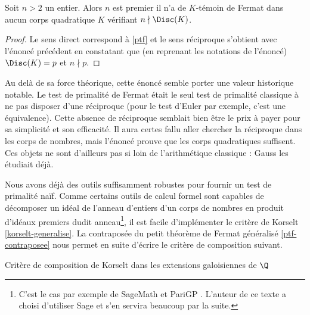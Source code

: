 \begin{theoreme}\label{ptf-reciproque}
	Soit $n>2$ un entier. Alors $n$ est premier \ssi il n'a de $K$-témoin de Fermat dans aucun corps quadratique $K$ vérifiant $n\nmid \Disc(K)$.
\end{theoreme}

\begin{proof}
	Le sens direct correspond à \ref{ptf} et le sens réciproque s'obtient avec l'énoncé précédent en constatant que (en reprenant les notations de l'énoncé) $\Disc(K) = p$ et $n\nmid p$.
\end{proof}

\begin{remarque}
Au delà de sa force théorique, cette énoncé semble porter une valeur historique notable. Le test de primalité de Fermat était le seul test de primalité classique à ne pas disposer d'une réciproque (pour le test d'Euler par exemple, c'est une équivalence). Cette absence de réciproque semblait bien être le prix à payer pour sa simplicité et son efficacité. Il aura certes fallu aller chercher la réciproque dans les corps de nombres, mais l'énoncé prouve que les corps quadratiques suffisent. Ces objets ne sont d'ailleurs pas si loin de l'arithmétique classique : Gauss les étudiait déjà.
\end{remarque}

Nous avons déjà des outils suffisamment robustes pour fournir un test de primalité naïf. Comme certains outils de calcul formel sont capables de décomposer un idéal de l'anneau d'entiers d'un corps de nombres en produit d'idéaux premiers dudit anneau\footnote{C'est le cas par exemple de SageMath et PariGP . L'auteur de ce texte a choisi d'utiliser Sage et s'en servira beaucoup par la suite.}, il est facile d'implémenter le critère de Korselt \ref{korselt-generalise}. La contraposée du petit théorème de Fermat généralisé \ref{ptf-contraposee} nous permet en suite d'écrire le critère de composition suivant.

\vspace{1em}
\begin{algorithm}[H]\label{test-primalite-korselt}
\caption{Critère de composition de Korselt dans les extensions galoisiennes de $\Q$}
\end{algorithm}
\vspace{1em}

